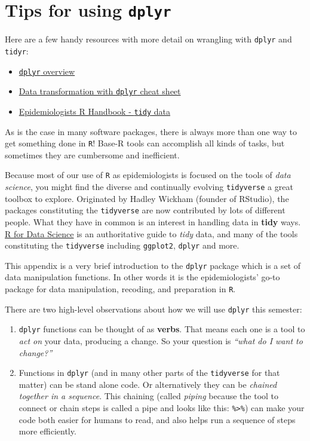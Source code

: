 \documentclass[
]{book}
\providecommand{\tightlist}{%
  \setlength{\itemsep}{0pt}\setlength{\parskip}{0pt}}
\begin{document}
\hypertarget{dplyr}{%
\chapter{\texorpdfstring{Tips for using \texttt{dplyr}}{Tips for using dplyr}}\label{dplyr}}

Here are a few handy resources with more detail on wrangling with \texttt{dplyr} and \texttt{tidyr}:

\begin{itemize}
\tightlist
\item
  \href{https://dplyr.tidyverse.org/}{\texttt{dplyr} overview}
\item
  \href{https://github.com/rstudio/cheatsheets/raw/master/data-transformation.pdf}{Data transformation with \texttt{dplyr} cheat sheet}
\item
  \href{https://epirhandbook.com/transition-to-r.html?q=tidy\#tidy-data}{Epidemiologists R Handbook - \texttt{tidy} data}
\end{itemize}

As is the case in many software packages, there is always more than one way to get something done in \texttt{R}! Base-R tools can accomplish all kinds of tasks, but sometimes they are cumbersome and inefficient.

Because most of our use of \texttt{R} as epidemiologists is focused on the tools of \emph{data science}, you might find the diverse and continually evolving \texttt{tidyverse} a great toolbox to explore. Originated by Hadley Wickham (founder of RStudio), the packages constituting the \texttt{tidyverse} are now contributed by lots of different people. What they have in common is an interest in handling data in \textbf{tidy} ways. \href{https://r4ds.had.co.nz/}{R for Data Science} is an authoritative guide to \emph{tidy} data, and many of the tools constituting the \texttt{tidyverse} including \texttt{ggplot2}, \texttt{dplyr} and more.

This appendix is a very brief introduction to the \texttt{dplyr} package which is a set of data manipulation functions. In other words it is the epidemiologists' go-to package for data manipulation, recoding, and preparation in \texttt{R}.

There are two high-level observations about how we will use \texttt{dplyr} this semester:

\begin{enumerate}
\def\labelenumi{\arabic{enumi}.}
\tightlist
\item
  \texttt{dplyr} functions can be thought of as \textbf{verbs}. That means each one is a tool to \emph{act on} your data, producing a change. So your question is \emph{``what do I want to change?''}
\item
  Functions in \texttt{dplyr} (and in many other parts of the \texttt{tidyverse} for that matter) can be stand alone code. Or alternatively they can be \emph{chained together in a sequence}. This chaining (called \emph{piping} because the tool to connect or chain steps is called a pipe and looks like this: \texttt{\%\textgreater{}\%}) can make your code both easier for humans to read, and also helps run a sequence of steps more efficiently.
\end{enumerate}
\end{document}
